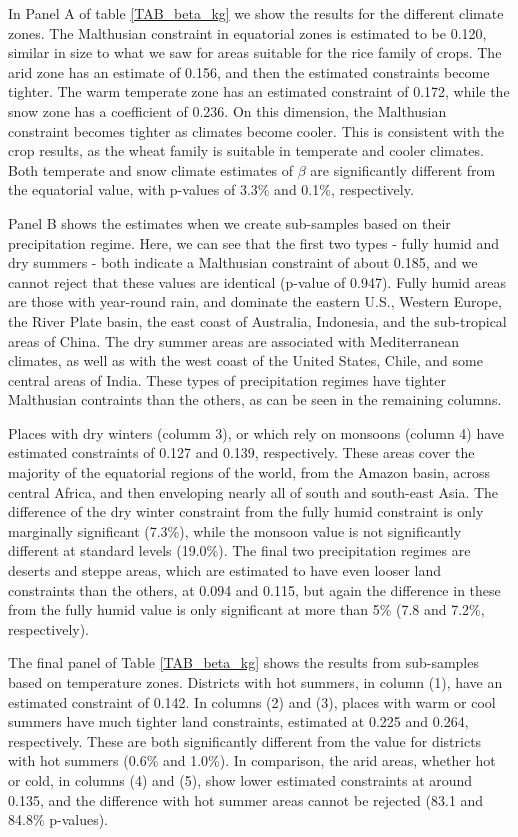 \documentclass[11pt]{article}
\begin{document}
In Panel A of table \ref{TAB_beta_kg} we show the results for the different climate zones. The Malthusian constraint in equatorial zones is estimated to be 0.120, similar in size to what we saw for areas suitable for the rice family of crops. The arid zone has an estimate of 0.156, and then the estimated constraints become tighter. The warm temperate zone has an estimated constraint of 0.172, while the snow zone has a coefficient of 0.236. On this dimension, the Malthusian constraint becomes tighter as climates become cooler. This is consistent with the crop results, as the wheat family is suitable in temperate and cooler climates. Both temperate and snow climate estimates of $\beta$ are significantly different from the equatorial value, with p-values of 3.3\% and 0.1\%, respectively.

Panel B shows the estimates when we create sub-samples based on their precipitation regime. Here, we can see that the first two types - fully humid and dry summers - both indicate a Malthusian constraint of about 0.185, and we cannot reject that these values are identical (p-value of 0.947). Fully humid areas are those with year-round rain, and dominate the eastern U.S., Western Europe, the River Plate basin, the east coast of Australia, Indonesia, and the sub-tropical areas of China. The dry summer areas are associated with Mediterranean climates, as well as with the west coast of the United States, Chile, and some central areas of India. These types of precipitation regimes have tighter Malthusian contraints than the others, as can be seen in the remaining columns.

Places with dry winters (columm 3), or which rely on monsoons (column 4) have estimated constraints of 0.127 and 0.139, respectively. These areas cover the majority of the equatorial regions of the world, from the Amazon basin, across central Africa, and then enveloping nearly all of south and south-east Asia. The difference of the dry winter constraint from the fully humid constraint is only marginally significant (7.3\%), while the monsoon value is not significantly different at standard levels (19.0\%). The final two precipitation regimes are deserts and steppe areas, which are estimated to have even looser land constraints than the others, at 0.094 and 0.115, but again the difference in these from the fully humid value is only significant at more than 5\% (7.8 and 7.2\%, respectively).

The final panel of Table \ref{TAB_beta_kg} shows the results from sub-samples based on temperature zones. Districts with hot summers, in column (1), have an estimated constraint of 0.142. In columns (2) and (3), places with warm or cool summers have much tighter land constraints, estimated at 0.225 and 0.264, respectively. These are both significantly different from the value for districts with hot summers (0.6\% and 1.0\%). In comparison, the arid areas, whether hot or cold, in columns (4) and (5), show lower estimated constraints at around 0.135, and the difference with hot summer areas cannot be rejected (83.1 and 84.8\% p-values).
\end{document}

